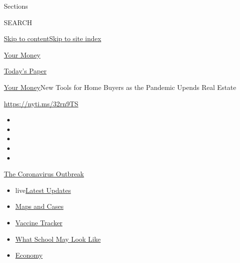 Sections

SEARCH

\protect\hyperlink{site-content}{Skip to
content}\protect\hyperlink{site-index}{Skip to site index}

\href{https://www.nytimes.com/section/your-money}{Your Money}

\href{https://myaccount.nytimes.com/auth/login?response_type=cookie\&client_id=vi}{}

\href{https://www.nytimes.com/section/todayspaper}{Today's Paper}

\href{/section/your-money}{Your Money}\textbar{}New Tools for Home
Buyers as the Pandemic Upends Real Estate

\url{https://nyti.ms/32rn9TS}

\begin{itemize}
\item
\item
\item
\item
\item
\end{itemize}

\href{https://www.nytimes.com/news-event/coronavirus?action=click\&pgtype=Article\&state=default\&region=TOP_BANNER\&context=storylines_menu}{The
Coronavirus Outbreak}

\begin{itemize}
\tightlist
\item
  live\href{https://www.nytimes.com/2020/08/01/world/coronavirus-covid-19.html?action=click\&pgtype=Article\&state=default\&region=TOP_BANNER\&context=storylines_menu}{Latest
  Updates}
\item
  \href{https://www.nytimes.com/interactive/2020/us/coronavirus-us-cases.html?action=click\&pgtype=Article\&state=default\&region=TOP_BANNER\&context=storylines_menu}{Maps
  and Cases}
\item
  \href{https://www.nytimes.com/interactive/2020/science/coronavirus-vaccine-tracker.html?action=click\&pgtype=Article\&state=default\&region=TOP_BANNER\&context=storylines_menu}{Vaccine
  Tracker}
\item
  \href{https://www.nytimes.com/interactive/2020/07/29/us/schools-reopening-coronavirus.html?action=click\&pgtype=Article\&state=default\&region=TOP_BANNER\&context=storylines_menu}{What
  School May Look Like}
\item
  \href{https://www.nytimes.com/live/2020/07/31/business/stock-market-today-coronavirus?action=click\&pgtype=Article\&state=default\&region=TOP_BANNER\&context=storylines_menu}{Economy}
\end{itemize}

